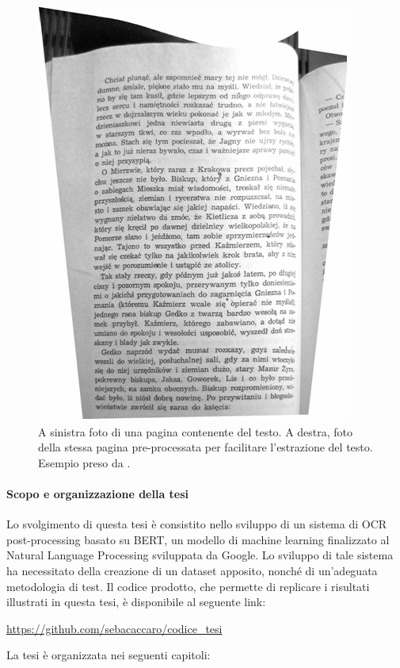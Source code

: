 \begin{figure}[H]
{\begin{minipage}{0.35\textwidth}
\includegraphics[width=\textwidth]{immagini/stato_arte/prep2}
\end{minipage}
\caption{A sinistra foto di una pagina contenente del testo. A destra, foto della stessa pagina pre-processata per facilitare l'estrazione del testo. Esempio preso da \cite{bieniecki2007image}.}
\label{fig:art_prep_ex}
}
\end{figure}
\noindent

\paragraph{Scopo e organizzazione della tesi} Lo svolgimento di questa tesi è consistito nello sviluppo di un sistema di OCR post-processing basato su BERT, un modello di machine learning finalizzato al Natural Language Processing sviluppata da Google. Lo sviluppo di tale sistema ha necessitato della creazione di un dataset apposito, nonché di un'adeguata metodologia di test. Il codice prodotto, che permette di replicare i risultati illustrati in questa tesi, è disponibile al seguente link:
\begin{center}
\url{https://github.com/sebacaccaro/codice_tesi}
\end{center}
\noindent
La tesi è organizzata nei seguenti capitoli:

